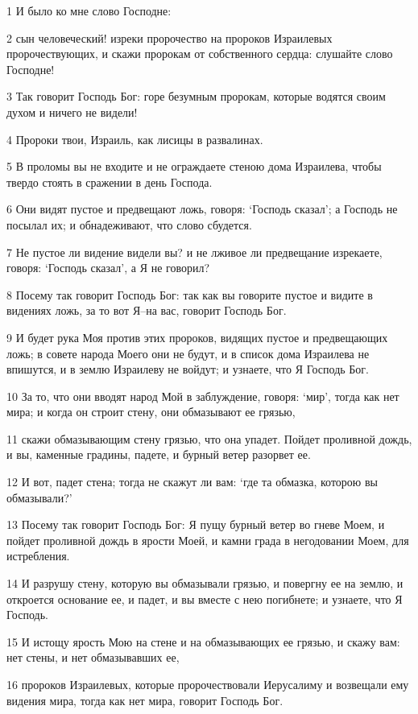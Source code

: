 \par 1 И было ко мне слово Господне:
\par 2 сын человеческий! изреки пророчество на пророков Израилевых пророчествующих, и скажи пророкам от собственного сердца: слушайте слово Господне!
\par 3 Так говорит Господь Бог: горе безумным пророкам, которые водятся своим духом и ничего не видели!
\par 4 Пророки твои, Израиль, как лисицы в развалинах.
\par 5 В проломы вы не входите и не ограждаете стеною дома Израилева, чтобы твердо стоять в сражении в день Господа.
\par 6 Они видят пустое и предвещают ложь, говоря: `Господь сказал'; а Господь не посылал их; и обнадеживают, что слово сбудется.
\par 7 Не пустое ли видение видели вы? и не лживое ли предвещание изрекаете, говоря: `Господь сказал', а Я не говорил?
\par 8 Посему так говорит Господь Бог: так как вы говорите пустое и видите в видениях ложь, за то вот Я--на вас, говорит Господь Бог.
\par 9 И будет рука Моя против этих пророков, видящих пустое и предвещающих ложь; в совете народа Моего они не будут, и в список дома Израилева не впишутся, и в землю Израилеву не войдут; и узнаете, что Я Господь Бог.
\par 10 За то, что они вводят народ Мой в заблуждение, говоря: `мир', тогда как нет мира; и когда он строит стену, они обмазывают ее грязью,
\par 11 скажи обмазывающим стену грязью, что она упадет. Пойдет проливной дождь, и вы, каменные градины, падете, и бурный ветер разорвет ее.
\par 12 И вот, падет стена; тогда не скажут ли вам: `где та обмазка, которою вы обмазывали?'
\par 13 Посему так говорит Господь Бог: Я пущу бурный ветер во гневе Моем, и пойдет проливной дождь в ярости Моей, и камни града в негодовании Моем, для истребления.
\par 14 И разрушу стену, которую вы обмазывали грязью, и повергну ее на землю, и откроется основание ее, и падет, и вы вместе с нею погибнете; и узнаете, что Я Господь.
\par 15 И истощу ярость Мою на стене и на обмазывающих ее грязью, и скажу вам: нет стены, и нет обмазывавших ее,
\par 16 пророков Израилевых, которые пророчествовали Иерусалиму и возвещали ему видения мира, тогда как нет мира, говорит Господь Бог.
